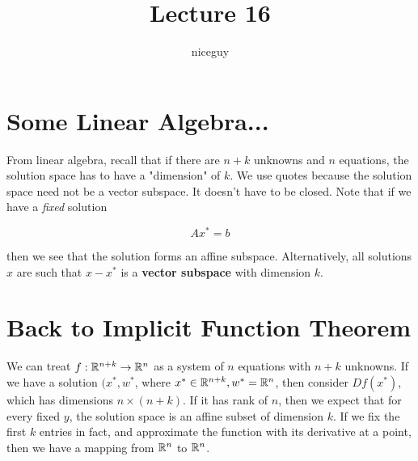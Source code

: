 \documentclass[12pt]{article}
\title{Lecture 16}
\author{niceguy}
\begin{document}
\maketitle

\section{Some Linear Algebra...}

From linear algebra, recall that if there are $n+k$ unknowns and $n$ equations, the solution space has to have a "dimension" of $k$. We use quotes because the solution space need not be a vector subspace. It doesn't have to be closed. Note that if we have a \textit{fixed} solution

$$Ax^* = b$$

then we see that the solution forms an affine subspace. Alternatively, all solutions $x$ are such that $x - x^*$ is a \textbf{vector subspace} with dimension $k$.

\section{Back to Implicit Function Theorem}

We can treat $f:\mathbb{R}^{n+k}\rightarrow \mathbb{R}^n$ as a system of $n$ equations with $n+k$ unknowns. If we have a solution $(x^*, w^*$, where $x^* \in \mathbb{R}^{n+k}, w^* = \mathbb{R}^n$, then consider $Df(x^*)$, which has dimensions $n \times (n+k)$. If it has rank of $n$, then we expect that for every fixed $y$, the solution space is an affine subset of dimension $k$. If we fix the first $k$ entries in fact, and approximate the function with its derivative at a point, then we have a mapping from $\mathbb{R}^n$ to $\mathbb{R}^n$.
\end{document}
